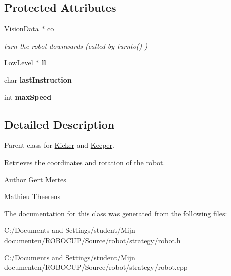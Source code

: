 \subsection*{Protected Attributes}
\begin{DoxyCompactItemize}
\item 
\hypertarget{class_robot_a80e7da8cc31fc499b8989525c77dd953}{\hyperlink{class_vision_data}{Vision\-Data} $\ast$ \hyperlink{class_robot_a80e7da8cc31fc499b8989525c77dd953}{co}}\label{class_robot_a80e7da8cc31fc499b8989525c77dd953}

\begin{DoxyCompactList}\small\item\em turn the robot downwards (called by turnto() ) \end{DoxyCompactList}\item 
\hypertarget{class_robot_ac71f08513874243ff371a26b181edd1c}{\hyperlink{class_low_level}{Low\-Level} $\ast$ {\bfseries ll}}\label{class_robot_ac71f08513874243ff371a26b181edd1c}

\item 
\hypertarget{class_robot_a21b44a9456438862af64b21431e5994b}{char {\bfseries last\-Instruction}}\label{class_robot_a21b44a9456438862af64b21431e5994b}

\item 
\hypertarget{class_robot_accc4a8651001c13feff2b550202599f5}{int {\bfseries max\-Speed}}\label{class_robot_accc4a8651001c13feff2b550202599f5}

\end{DoxyCompactItemize}


\subsection{Detailed Description}
Parent class for \hyperlink{class_kicker}{Kicker} and \hyperlink{class_keeper}{Keeper}. 

Retrieves the coordinates and rotation of the robot.

\begin{DoxyAuthor}{Author}
Gert Mertes

Mathieu Theerens 
\end{DoxyAuthor}


The documentation for this class was generated from the following files\-:\begin{DoxyCompactItemize}
\item 
C\-:/\-Documents and Settings/student/\-Mijn documenten/\-R\-O\-B\-O\-C\-U\-P/\-Source/robot/strategy/robot.\-h\item 
C\-:/\-Documents and Settings/student/\-Mijn documenten/\-R\-O\-B\-O\-C\-U\-P/\-Source/robot/strategy/robot.\-cpp\end{DoxyCompactItemize}
